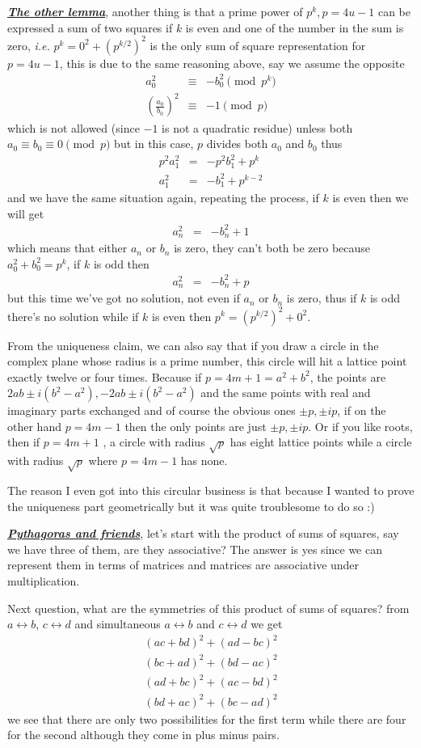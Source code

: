 \documentclass[aps,preprint,preprintnumbers,nofootinbib,showpacs,prd]{revtex4-1}
\newcommand{\ie}{{\it i.e.} }
\newcommand{\nbea}{\begin{eqnarray*}}
\newcommand{\neea}{\end{eqnarray*}}
\begin{document}
\underline{\textit{\textbf{The other lemma}}}, another thing is that a prime power of $p^k, p = 4u-1$ can be expressed a sum of two squares if $k$ is even and one of the number in the sum is zero, \ie $p^k = 0^2 + (p^{k/2})^2$ is the only sum of square representation for $p =4u-1$, this is due to the same reasoning above, say we assume the opposite
%
\nbea
a_0^2 & \equiv & - b_0^2 \pmod{p^k} \\
\left(\frac{a_0}{b_0}\right)^2 & \equiv & - 1 \pmod{p}
\neea
%
which is not allowed (since $-1$ is not a quadratic residue) unless both $a_0 \equiv b_0 \equiv 0 \pmod{p}$ but in this case, $p$ divides both $a_0$ and $b_0$ thus
%
\nbea
p^2 a_1^2 & = & -p^2 b_1^2 + p^{k} \\
a_1^2 & = & -b_1^2 + p^{k-2}
\neea
%
and we have the same situation again, repeating the process, if $k$ is even then we will get 
%
\nbea
a_n^2 & = & -b_n^2 + 1
\neea
%
which means that either $a_n$ or $b_n$ is zero, they can't both be zero because $a_0^2 + b_0^2 = p^k$, if $k$ is odd then
%
\nbea
a_n^2 & = & -b_n^2 + p
\neea
%
but this time we've got no solution, not even if $a_n$ or $b_n$ is zero, thus if $k$ is odd there's no solution while if $k$ is even then $p^k = (p^{k/2})^2 + 0^2$.

From the uniqueness claim, we can also say that if you draw a circle in the complex plane whose radius is a prime number, this circle will hit a lattice point exactly twelve or four times. Because if $p = 4m+1 = a^2 + b^2$, the points are $2ab\pm i(b^2-a^2),-2ab\pm i(b^2-a^2)$ and the same points with real and imaginary parts exchanged and of course the obvious ones $\pm p, \pm ip$, if on the other hand $p = 4m-1$ then the only points are just $\pm p, \pm ip$. Or if you like roots, then if $p = 4m+1$ , a circle with radius $\sqrt{p}$ has eight lattice points while a circle with radius $\sqrt{p}$ where $p=4m-1$ has none.

The reason I even got into this circular business is that because I wanted to prove the uniqueness part geometrically but it was quite troublesome to do so :)

\underline{\textit{\textbf{Pythagoras and friends}}}, let's start with the product of sums of squares, say we have three of them, are they associative? The answer is yes since we can represent them in terms of matrices and matrices are associative under multiplication.

Next question, what are the symmetries of this product of sums of squares? from $a\leftrightarrow b$, $c\leftrightarrow d$ and simultaneous $a\leftrightarrow b$ and $c\leftrightarrow d$ we get
%
\nbea
(ac + bd)^2 + (ad - bc)^2 \\
(bc + ad)^2 + (bd - ac)^2 \\
(ad + bc)^2 + (ac - bd)^2 \\
(bd + ac)^2 + (bc - ad)^2
\neea
%
we see that there are only two possibilities for the first term while there are four for the second although they come in plus minus pairs.
\end{document}
